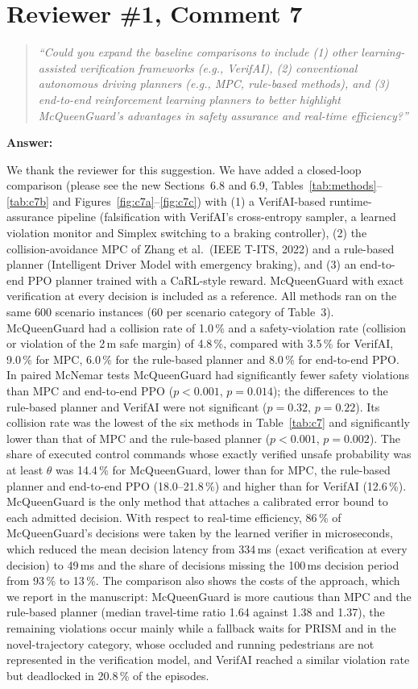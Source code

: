 \documentclass[11pt]{article}
\newenvironment{revcomment}{\begin{quote}\itshape}{\end{quote}}
\newcommand{\answerhead}[1]{\par\medskip\noindent\textbf{#1}\par}
\begin{document}
\section*{Reviewer \#1, Comment 7}
\begin{revcomment}
``Could you expand the baseline comparisons to include (1) other learning-assisted verification frameworks (e.g., VerifAI),
(2) conventional autonomous driving planners (e.g., MPC, rule-based methods), and (3) end-to-end reinforcement learning planners
to better highlight McQueenGuard's advantages in safety assurance and real-time efficiency?''
\end{revcomment}
\answerhead{Answer:}
We thank the reviewer for this suggestion. We have added a closed-loop comparison (please see the new Sections~6.8 and 6.9,
Tables~\ref{tab:methods}--\ref{tab:c7b} and Figures~\ref{fig:c7a}--\ref{fig:c7c}) with (1) a VerifAI-based runtime-assurance
pipeline (falsification with VerifAI's cross-entropy sampler, a learned violation monitor and Simplex switching to a braking
controller), (2) the collision-avoidance MPC of Zhang et al.\ (IEEE T-ITS, 2022) and a rule-based planner (Intelligent Driver
Model with emergency braking), and (3) an end-to-end PPO planner trained with a CaRL-style reward. McQueenGuard with exact
verification at every decision is included as a reference. All methods ran on the same 600 scenario instances (60
per scenario category of Table~3). McQueenGuard had a collision rate of 1.0\,\% and a safety-violation rate
(collision or violation of the 2\,m safe margin) of 4.8\,\%, compared with
3.5\,\% for VerifAI, 9.0\,\% for MPC, 6.0\,\%
for the rule-based planner and 8.0\,\% for end-to-end PPO. In paired McNemar tests McQueenGuard had significantly fewer safety violations than MPC and end-to-end PPO ($p<0.001$, $p=0.014$); the differences to the rule-based planner and VerifAI were not significant ($p=0.32$, $p=0.22$). Its collision rate was the lowest of the six methods in Table~\ref{tab:c7} and significantly lower than that of MPC and the rule-based planner ($p<0.001$, $p=0.002$). The share of executed control commands whose exactly verified unsafe probability was at least $\theta$ was 14.4\,\% for McQueenGuard, lower than for MPC, the rule-based planner and end-to-end PPO (18.0--21.8\,\%) and higher than for VerifAI (12.6\,\%). McQueenGuard is the only method that attaches a
calibrated error bound to each admitted decision. With respect to
real-time efficiency, 86\,\% of McQueenGuard's decisions were taken by the learned verifier in
microseconds, which reduced the mean decision latency from 334\,ms (exact verification at every
decision) to 49\,ms and the share of decisions missing the 100\,ms decision period from
93\,\% to 13\,\%. The comparison also shows the costs of the approach, which we
report in the manuscript: McQueenGuard is more cautious than MPC and the rule-based planner (median travel-time ratio
1.64 against 1.38 and 1.37), the remaining
violations occur mainly while a fallback waits for PRISM and in the novel-trajectory category, whose occluded and running
pedestrians are not represented in the verification model, and VerifAI reached a similar violation rate but deadlocked in
20.8\,\% of the episodes.
\end{document}
